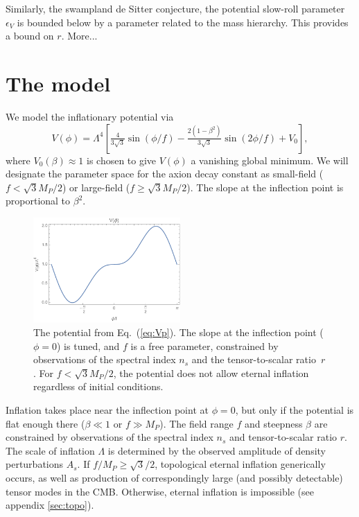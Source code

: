 \documentclass[aps,amsfonts,amsmath,prd,preprint,nofootinbib,superscriptaddress]{revtex4}
\newcommand{\Mp}{{M_{P}}}
\newcommand{\MMp}{{M_P^2}}
\newcommand{\beq}{\begin{equation}}
\newcommand{\eeq}{\end{equation}}
\begin{document}
Similarly, the swampland de Sitter conjecture, the potential slow-roll parameter $\epsilon_V$ is bounded below by a parameter related to the mass hierarchy.
This provides  \cite{Dias:2018ngv} a bound on $r$. More...


\section{The model}
 We model the inflationary potential via
\beq
V(\phi) = \Lambda^4\left[\tfrac{4}{3\sqrt{3}}\sin(\phi/f) -\tfrac{2(1 - \beta^2)}{3\sqrt{3}} \sin(2\phi/f) + V_0  \right], \label{eq:Vp}
\eeq
where $V_0(\beta) \approx 1$ is chosen to give $V(\phi)$ a vanishing global minimum.
We will designate the parameter space for the axion decay constant as small-field ($f < \sqrt{3}\Mp/2$) or large-field ($f \geq \sqrt{3}\Mp/2$). %
The slope at the inflection point is proportional to $\beta^2$.

\begin{figure}[!h]
  \centering
    \includegraphics[width=0.5\textwidth]{figures/V.pdf}
    \caption{The potential from Eq.~(\ref{eq:Vp}).  The slope at the inflection point ($\phi = 0$) is tuned, and $f$ is a free parameter, constrained by 
    observations of the spectral index $n_s$ and the tensor-to-scalar ratio~$r$.  For $f < \sqrt{3}\Mp/2$, the potential does not allow eternal inflation regardless of initial conditions.}
\end{figure}


Inflation takes place near the inflection point at $\phi = 0$, but only if the potential is flat enough there ($\beta \ll 1$ or $f \gg \Mp$).
The field range $f$ and steepness $\beta$ are constrained by observations of the spectral index $n_s$ and tensor-to-scalar 
ratio $r$.   The scale of inflation $\Lambda$ is determined by the observed amplitude of density perturbations $A_s$.
If $f/\Mp \geq \sqrt{3}/2$, topological eternal inflation generically occurs, as well as production of correspondingly large (and possibly detectable) tensor modes in the CMB.   
 Otherwise, eternal inflation is impossible (see appendix \ref{sec:topo}).
\end{document}
